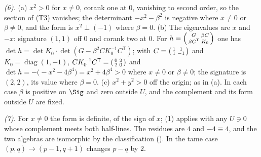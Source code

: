 \emph{(6).} (a) $x^{2} > 0$ for $x \neq 0$, corank one at $0$, vanishing to second order, so the section of (T3) vanishes; the determinant $-x^{2} - \beta^{2}$ is negative where $x \neq 0$ or $\beta \neq 0$, and the form is $x^{2} \perp (-1)$ where $\beta = 0$. (b) The eigenvalues are $x$ and $-x$: signature $(1,1)$ off $0$ and corank two at $0$. For $h = \begin{psmallmatrix} G & \beta C \\ \beta C^{\mathsf T} & K_{0}\end{psmallmatrix}$ one has $\det h = \det K_{0}\cdot\det(G - \beta^{2}CK_{0}^{-1}C^{\mathsf T})$; with $C = \begin{psmallmatrix} 1 & 1 \\ 1 & -1\end{psmallmatrix}$ and $K_{0} = \operatorname{diag}(1,-1)$, $CK_{0}^{-1}C^{\mathsf T} = \begin{psmallmatrix} 0 & 2 \\ 2 & 0\end{psmallmatrix}$ and $\det h = -\bigl(-x^{2} - 4\beta^{4}\bigr) = x^{2} + 4\beta^{4} > 0$ where $x \neq 0$ or $\beta \neq 0$; the signature is $(2,2)$, its value where $\beta = 0$. (c) $x^{2} + y^{2} > 0$ off the origin; as in (a). In each case $\beta$ is positive on $\Sig$ and zero outside $U$, and the complement and its form outside $U$ are fixed.

\emph{(7).} For $x \neq 0$ the form is definite, of the sign of $x$; (1) applies with any $U \ni 0$ whose complement meets both half-lines. The residues are $4$ and $-4 \equiv 4$, and the two algebras are isomorphic by the classification (). In the tame case $(p,q) \to (p-1,q+1)$ changes $p - q$ by $2$.

